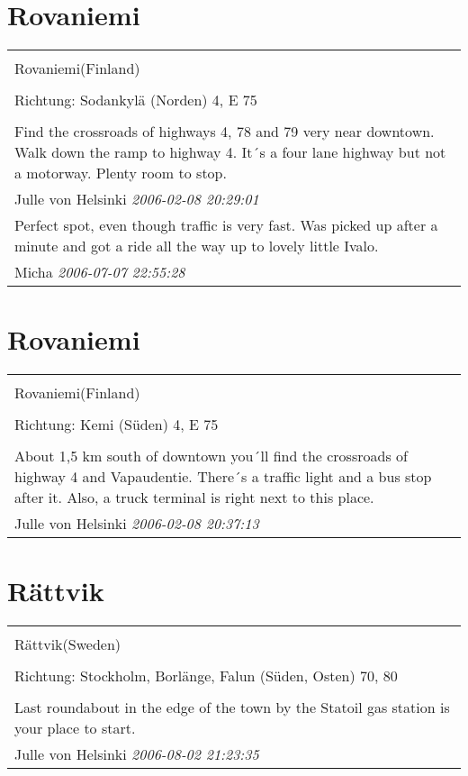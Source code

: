 \documentclass[a4paper,12pt]{article}
\begin{document}
\section{Rovaniemi}
\begin{tabular}{|p{13cm}|}
\hline\\
Rovaniemi(Finland)\\
\\
Richtung: Sodankylä (Norden) 4, E 75 \\
\hline\\
Find the crossroads of highways 4, 78 and 79 very near downtown. Walk down the ramp to highway 4. It´s a four lane highway but not a motorway. Plenty room to stop. \\
Julle von Helsinki \textit{ 2006-02-08 20:29:01 }\\\hline Perfect spot, even though traffic is very fast. Was picked up after a minute and got a ride all the way up to lovely little Ivalo. \\
Micha \textit{ 2006-07-07 22:55:28 }\\\hline
\end{tabular}


\section{Rovaniemi}
\begin{tabular}{|p{13cm}|}
\hline\\
Rovaniemi(Finland)\\
\\
Richtung: Kemi (Süden) 4, E 75 \\
\hline\\
About 1,5 km south of downtown you´ll find the crossroads of highway 4 and Vapaudentie. There´s a traffic light and a bus stop after it. Also, a truck terminal is right next to this place. \\
Julle von Helsinki \textit{ 2006-02-08 20:37:13 }\\\hline
\end{tabular}


\section{Rättvik}
\begin{tabular}{|p{13cm}|}
\hline\\
Rättvik(Sweden)\\
\\
Richtung: Stockholm, Borlänge, Falun (Süden, Osten) 70, 80 \\
\hline\\
Last roundabout in the edge of the town by the Statoil gas station is your place to start. \\
Julle von Helsinki \textit{ 2006-08-02 21:23:35 }\\\hline
\end{tabular}
\end{document}
